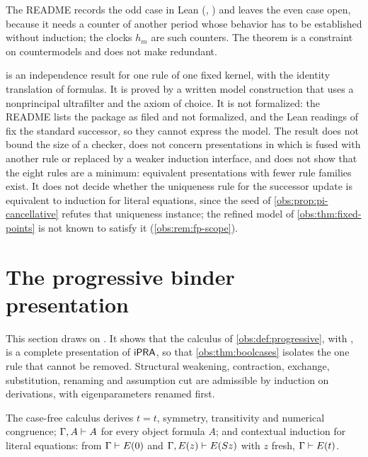 The README records the odd case in Lean (,
) and leaves the even case open, because it needs a
counter of another period whose behavior has to be established without
induction; the clocks $h_m$ are such counters. The theorem is a constraint on
countermodels and does not make  redundant.

\begin{remark}
\label{obs:rem:pi-scope}
 is an independence result for one rule of
one fixed kernel, with the identity translation of formulas. It is proved by a
written model construction that uses a nonprincipal ultrafilter and the axiom
of choice. It is not formalized: the README lists the package
as filed and not formalized, and the Lean readings of  fix
the standard successor, so they cannot express the model. The result does not
bound the size of a checker, does not concern presentations in which
 is fused with another rule or replaced by a weaker induction
interface, and does not show that the eight rules are a minimum: equivalent
presentations with fewer rule families exist. It does not decide whether the
uniqueness rule for the successor update is equivalent to induction for
literal equations, since the seed of \cref{obs:prop:pi-cancellative} refutes
that uniqueness instance; the refined model of \cref{obs:thm:fixed-points} is
not known to satisfy it (\cref{obs:rem:fp-scope}).
\end{remark}

\section{The progressive binder presentation}
\label{obs:sec:progressive}

This section draws on . It shows that the calculus of
\cref{obs:def:progressive}, with , is a complete
presentation of $\mathsf{iPRA}$, so that \cref{obs:thm:boolcases} isolates the one rule
that cannot be removed. Structural weakening, contraction, exchange,
substitution, renaming and assumption cut are admissible by induction on
derivations, with eigenparameters renamed first.

\begin{lemma}
\label{obs:lem:Hidentity}
The case-free calculus derives $t=t$, symmetry, transitivity and numerical
congruence; $\Gamma,A\vdash A$ for every object formula $A$; and contextual
induction for literal equations: from $\Gamma\vdash E(0)$ and
$\Gamma,E(z)\vdash E(S z)$ with $z$ fresh, $\Gamma\vdash E(t)$.
\end{lemma}

